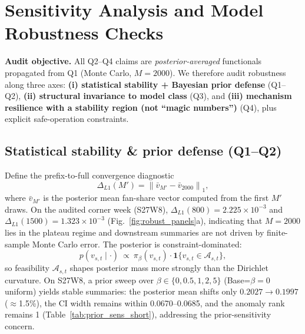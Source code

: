 
\section{Sensitivity Analysis and Model Robustness Checks}
\label{sec:robustness}

\textbf{Audit objective.}
All Q2--Q4 claims are \emph{posterior-averaged} functionals propagated from Q1 (Monte Carlo, $M=2000$). We therefore audit robustness along three axes: \textbf{(i) statistical stability + Bayesian prior defense} (Q1--Q2), \textbf{(ii) structural invariance to model class} (Q3), and \textbf{(iii) mechanism resilience with a stability region (not ``magic numbers'')} (Q4), plus explicit safe-operation constraints.

\vspace{-0.35em}
\subsection{Statistical stability \& prior defense (Q1--Q2)}
\vspace{-0.35em}

Define the prefix-to-full convergence diagnostic
\begin{equation}
\Delta_{L1}(M')=\left\|\bar v_{M'}-\bar v_{2000}\right\|_1,
\label{eq:l1def}
\end{equation}
where $\bar v_{M'}$ is the posterior mean fan-share vector computed from the first $M'$ draws. On the audited corner week (S27W8), $\Delta_{L1}(800)=2.225\times10^{-3}$ and $\Delta_{L1}(1500)=1.323\times10^{-3}$ (Fig.~\ref{fig:robust_panels}a), indicating that $M=2000$ lies in the plateau regime and downstream summaries are not driven by finite-sample Monte Carlo error.
The posterior is constraint-dominated:
\[
p(v_{s,t}\mid\cdot)\ \propto\ \pi_{\beta}(v_{s,t})\cdot \mathbf{1}\{v_{s,t}\in\mathcal{A}_{s,t}\},
\]
so feasibility $\mathcal{A}_{s,t}$ shapes posterior mass more strongly than the Dirichlet curvature. On S27W8, a prior sweep over $\beta\in\{0,0.5,1,2,5\}$ (Base=$\beta=0$ uniform) yields stable summaries: the posterior mean shifts only $0.2027\to0.1997$ ($\approx$1.5\%), the CI width remains within 0.0670--0.0685, and the anomaly rank remains 1 (Table~\ref{tab:prior_sens_short}), addressing the prior-sensitivity concern.

